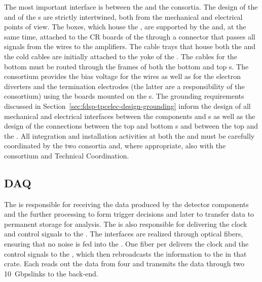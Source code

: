 The most important interface is between the 
and the  consortia. The design of the 
and of the s are strictly intertwined, both from the
mechanical and electrical points of view. The 
boxes, which house the , are supported by the 
and, at the same time, attached to the CR boards of the 
through a connector that passes all signals from the wires to
the  amplifiers. The cable trays that house both the
 and the  cold cables are initially
attached to the yoke of the . The 
cables for the bottom  must be routed through the 
frames of both the bottom and top s. The 
consortium provides the bias voltage for the 
wires as well as for the electron diverters and the  termination electrodes (the latter are a responsibility of
the  consortium) using the  boards mounted
on the s. The grounding requirements discussed in
Section~\ref{sec:fdsp-tpcelec-design-grounding} inform the
design of all mechanical and electrical interfaces between
the  components and s as well as the
design of the connections between the top and bottom s
and between the top  and the . All 
integration and installation activities at both
the  and  must be carefully coordinated by
the two consortia and, where appropriate, also with the 
consortium and Technical Coordination.

\subsection{DAQ}
\label{sec:fdsp-tpcelec-interfaces-daq}

The  is responsible for receiving the data produced by the
 detector components and the further processing to
form trigger decisions and later to transfer data to 
permanent storage for analysis. The 
 is also responsible for delivering the clock and control
signals to the . The interfaces are realized 
through optical fibers, ensuring that no noise is fed into
the . One fiber per  delivers the
clock and the control signals to the , which then
rebroadcasts the information to the  in that 
crate. Each  reads out the data from four 
and transmits the data through two \SI{10}{Gbps}links to the  back-end.

